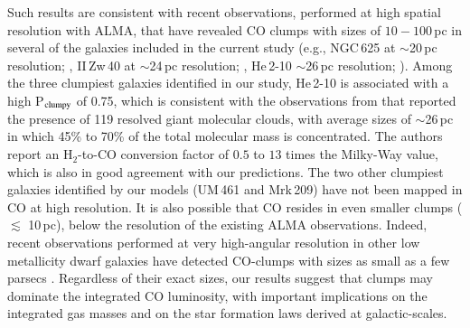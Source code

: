 \documentclass{aa}
\newcommand{\alphaCO}{\ifmmode \alpha_{\rm CO} \else $\alpha_{\rm CO}$\fi}
\begin{document}
Such results are consistent with recent observations, performed at high spatial resolution with ALMA, that have revealed CO clumps with sizes of $10-100$\,pc in several of the galaxies included in the current study (e.g., NGC\,625 at $\sim$20\,pc resolution; \citealt{Imara_ngc625_2020}, II\,Zw\,40 at $\sim$24\,pc resolution; \citealt{Kepley_2016}, He\,2-10 $\sim$26\,pc resolution; \citealt{Imara_faesi_2019}). 
Among the three clumpiest galaxies identified in our study, He\,2-10 is associated with a high P$_{\rm clumpy}$ of 0.75, which is consistent with the observations from \cite{Imara_faesi_2019} that reported the presence of 119 resolved giant molecular clouds, with average sizes of $\sim$26\,pc in which 45\% to 70\% of the total molecular mass is concentrated. The authors report an H$_2$-to-CO conversion factor of $0.5$ to $13$ times the Milky-Way value, which is also in good agreement with our predictions. The two other clumpiest galaxies identified by our models (UM\,461 and Mrk\,209) have not been mapped in CO at high resolution. It is also possible that CO resides in even smaller clumps ($\lesssim$ 10\,pc), below the resolution of the existing ALMA observations. Indeed, recent observations performed at very high-angular resolution in other low metallicity dwarf galaxies have detected CO-clumps with sizes as small as a few parsecs \citep[e.g.,][]{Oey_2017, Shi_2020, Schruba_2017, Rubio_2015, Archer_2022}. Regardless of their exact sizes, our results suggest that clumps may dominate the integrated CO luminosity, with important implications on the integrated gas masses and on the star formation laws derived at galactic-scales.

\end{document}
